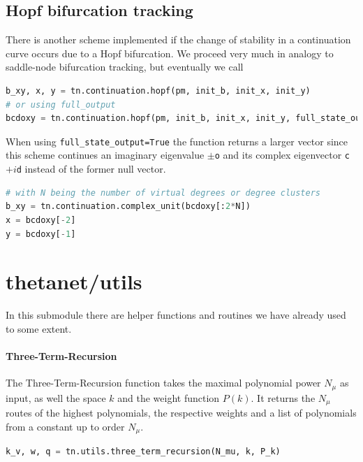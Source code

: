 \documentclass[bibliography=totoc, twoside]{article}
\numberwithin{equation}{section}
\begin{document}
\subsection{Hopf bifurcation tracking}
There is another scheme implemented if the change of stability in a continuation curve occurs due to a Hopf bifurcation.
We proceed very much in analogy to saddle-node bifurcation tracking, but eventually we call
\begin{lstlisting}[language=python]
b_xy, x, y = tn.continuation.hopf(pm, init_b, init_x, init_y)
# or using full_output
bcdoxy = tn.continuation.hopf(pm, init_b, init_x, init_y, full_state_output=True)
\end{lstlisting}
When using \texttt{full\_state\_output=True} the function returns a larger vector since this scheme continues an imaginary eigenvalue $\pm$\texttt{o} and its complex eigenvector \texttt{c}$+ i$\texttt{d} instead of the former null vector.
\begin{lstlisting}[language=python]
# with N being the number of virtual degrees or degree clusters
b_xy = tn.continuation.complex_unit(bcdoxy[:2*N])
x = bcdoxy[-2]
y = bcdoxy[-1]
\end{lstlisting}


\section{thetanet/utils}
In this submodule there are helper functions and routines we have already used to some extent.
\paragraph*{Three-Term-Recursion}
The Three-Term-Recursion function takes the maximal polynomial power $N_{\mu}$ as input, as well the space $k$ and the weight function $P(k)$.
It returns the $N_{\mu}$ routes of the highest polynomials, the respective weights and a list of polynomials from a constant up to order $N_{\mu}$.
\begin{lstlisting}[language=python]
k_v, w, q = tn.utils.three_term_recursion(N_mu, k, P_k)
\end{lstlisting}
\end{document}
